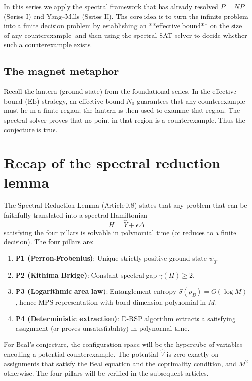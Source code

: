 \documentclass[11pt,a4paper]{article}
\begin{document}
In this series we apply the spectral framework that has already resolved \(P = NP\) (Series I) and Yang–Mills (Series II). The core idea is to turn the infinite problem into a finite decision problem by establishing an **effective bound** on the size of any counterexample, and then using the spectral SAT solver to decide whether such a counterexample exists.

\subsection{The magnet metaphor}

Recall the lantern (ground state) from the foundational series. In the effective bound (EB) strategy, an effective bound \(N_0\) guarantees that any counterexample must lie in a finite region; the lantern is then used to examine that region. The spectral solver proves that no point in that region is a counterexample. Thus the conjecture is true.

\section{Recap of the spectral reduction lemma}

The Spectral Reduction Lemma (Article 0.8) states that any problem that can be faithfully translated into a spectral Hamiltonian
\[
H = \hat{V} + \epsilon\Delta
\]
satisfying the four pillars is solvable in polynomial time (or reduces to a finite decision). The four pillars are:

\begin{enumerate}
\item \textbf{P1 (Perron‑Frobenius)}: Unique strictly positive ground state \(\psi_0\).
\item \textbf{P2 (Kithima Bridge)}: Constant spectral gap \(\gamma(H) \ge 2\).
\item \textbf{P3 (Logarithmic area law)}: Entanglement entropy \(S(\rho_B)=O(\log M)\), hence MPS representation with bond dimension polynomial in \(M\).
\item \textbf{P4 (Deterministic extraction)}: D‑RSP algorithm extracts a satisfying assignment (or proves unsatisfiability) in polynomial time.
\end{enumerate}

For Beal's conjecture, the configuration space will be the hypercube of variables encoding a potential counterexample. The potential \(\hat{V}\) is zero exactly on assignments that satisfy the Beal equation and the coprimality condition, and \(M^2\) otherwise. The four pillars will be verified in the subsequent articles.
\end{document}

